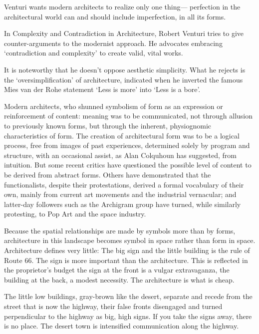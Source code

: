 

    Venturi wants modern architects to realize only one thing— perfection in the architectural world can and should include imperfection, in all its forms\cite{Lutolli2020}.


    In Complexity and Contradiction in Architecture, Robert Venturi tries to give counter-arguments to the modernist approach. He advocates embracing ‘contradiction and complexity’ to create valid, vital works.\cite{Lutolli2020}

    It is noteworthy that he doesn’t oppose aesthetic simplicity. What he rejects is the ‘oversimplification’ of architecture, indicated when he inverted the famous Mies van der Rohe statement ‘Less is more’ into ‘Less is a bore’.\cite{Lutolli2020}

    Modern architects, who shunned symbolism of form  as  an expression or reinforcement of content: meaning was  to  be  communicated,  not  through  allusion  to  previously  known forms, but through the inherent, physiognomic characteristics of form.
    The creation of architectural form was to be a logical process, free  from images  of past experiences, determined solely by program and structure, with an  occasional  assist,  as  Alan Colquhoun has  suggested, from  intuition.
    But some recent critics  have  questioned  the possible level of content to  be derived  from  abstract forms.
    Others have  demonstrated that the functionalists,  despite  their protestations, derived  a  formal vocabulary of their own, mainly from current art movements and the industrial vernacular;
    and  latter-day  followers  such  as  the  Archigram  group  have turned,  while  similarly  protesting,  to Pop  Art and  the space  industry.\cite{Venturi1972}

    Because the spatial relationships are made by symbols more than by forms, architecture in this landscape becomes symbol in space rather than form in space.
    Architecture defines very little: The big sign and the little building is the rule of Route 66.
    The sign is more important than the architecture.
    This is reflected in the proprietor's budget the sign at the front is a vulgar extravaganza, the building at the back, a modest necessity.
    The architecture is what is cheap.\cite{Venturi1972}

    The little low buildings, gray-brown like the desert, separate and recede from the street that is now the highway, their false fronts disengaged and turned perpendicular to the highway as big, high signs.
    If you take the signs away, there is no place.
    The desert town is intensified communication along the highway.\cite{Venturi1972}

